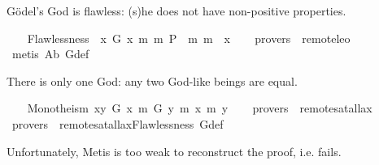 %
\begin{isabellebody}%
\def\isabellecontext{GoedelGodExtensions}%
%
\isadelimtheory
%
\endisadelimtheory
%
\isatagtheory
%
\endisatagtheory
{\isafoldtheory}%
%
\isadelimtheory
%
\endisadelimtheory
%
\isamarkuptrue%
%
\begin{isamarkuptext}%
G\"odel's God is flawless: (s)he does not have non-positive properties.%
\end{isamarkuptext}%
\isamarkuptrue%
\ \ \isamarkupfalse%
\ Flawlessness{\isacharcolon}\ {\isachardoublequoteopen}{\isacharbrackleft}{\isasymforall}{\isacharparenleft}{\isasymlambda}{\isasymPhi}{\isachardot}\ {\isasymforall}{\isacharparenleft}{\isasymlambda}x{\isachardot}\ {\isacharparenleft}G\ x\ m{\isasymrightarrow}\ {\isacharparenleft}m{\isasymnot}\ {\isacharparenleft}P\ {\isasymPhi}{\isacharparenright}\ m{\isasymrightarrow}\ m{\isasymnot}\ {\isacharparenleft}{\isasymPhi}\ x{\isacharparenright}{\isacharparenright}{\isacharparenright}{\isacharparenright}{\isacharparenright}{\isacharbrackright}{\isachardoublequoteclose}\isanewline
\ \ \isamarkupfalse%
\ {\isacharbrackleft}provers\ {\isacharequal}\ remote{\isacharunderscore}leo{}{\isacharbrackright}\ \isanewline
%
\isadelimproof
\ \ %
\endisadelimproof
%
\isatagproof
{}\isamarkupfalse%
\ {\isacharparenleft}metis\ A{}b\ G{\isacharunderscore}def{\isacharparenright}%
\endisatagproof
{\isafoldproof}%
%
\isadelimproof
%
\endisadelimproof
%
\begin{isamarkuptext}%
There is only one God: any two God-like beings are equal.%
\end{isamarkuptext}%
\isamarkuptrue%
\ \ \isamarkupfalse%
\ Monotheism{\isacharcolon}\ {\isachardoublequoteopen}{\isacharbrackleft}{\isasymforall}{\isacharparenleft}{\isasymlambda}x{\isachardot}{\isasymforall}{\isacharparenleft}{\isasymlambda}y{\isachardot}\ {\isacharparenleft}G\ x\ m{\isasymrightarrow}\ {\isacharparenleft}G\ y\ m{\isasymrightarrow}\ {\isacharparenleft}x\ m{\isacharequal}\ y{\isacharparenright}{\isacharparenright}{\isacharparenright}{\isacharparenright}{\isacharparenright}{\isacharbrackright}{\isachardoublequoteclose}\isanewline
\ \ \isamarkupfalse%
\ {\isacharbrackleft}provers\ {\isacharequal}\ remote{\isacharunderscore}satallax{\isacharbrackright}\isanewline
\ \ \isamarkupfalse%
\ {\isacharbrackleft}provers\ {\isacharequal}\ remote{\isacharunderscore}satallax{\isacharbrackright}{\isacharparenleft}Flawlessness\ G{\isacharunderscore}def{\isacharparenright}%
\isadelimproof
\ %
\endisadelimproof
%
\isatagproof
{}\isamarkupfalse%
%
\endisatagproof
{\isafoldproof}%
%
\isadelimproof
%
\endisadelimproof
%
\begin{isamarkuptext}%
Unfortunately, Metis is too weak to reconstruct the proof, i.e.  fails.%
\end{isamarkuptext}%
\isamarkuptrue%
%
\isadelimtheory
%
\endisadelimtheory
%
\isatagtheory
%
\endisatagtheory
{\isafoldtheory}%
%
\isadelimtheory
%
\endisadelimtheory
\ \end{isabellebody}%
